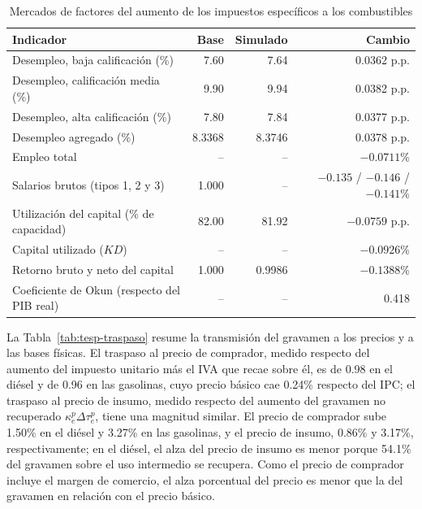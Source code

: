 \documentclass[11pt]{article}
\begin{document}
\begin{table}[H]
\centering
\caption{Mercados de factores del aumento de los impuestos específicos a los combustibles}
\small
\begin{tabular}{|l|r|r|r|}
  \hline
  Indicador & Base & Simulado & Cambio \\
  \hline
  Desempleo, baja calificación (\%) & 7.60 & 7.64 & 0.0362 p.p. \\
  \hline
  Desempleo, calificación media (\%) & 9.90 & 9.94 & 0.0382 p.p. \\
  \hline
  Desempleo, alta calificación (\%) & 7.80 & 7.84 & 0.0377 p.p. \\
  \hline
  Desempleo agregado (\%) & 8.3368 & 8.3746 & 0.0378 p.p. \\
  \hline
  Empleo total & -- & -- & $-0.0711$\% \\
  \hline
  Salarios brutos (tipos 1, 2 y 3) & 1.000 & -- & $-0.135$ / $-0.146$ / $-0.141$\% \\
  \hline
  Utilización del capital (\% de capacidad) & 82.00 & 81.92 & $-0.0759$ p.p. \\
  \hline
  Capital utilizado ($KD$) & -- & -- & $-0.0926$\% \\
  \hline
  Retorno bruto y neto del capital & 1.000 & 0.9986 & $-0.1388$\% \\
  \hline
  Coeficiente de Okun (respecto del PIB real) & -- & -- & 0.418 \\
  \hline
\end{tabular}
\end{table}

La Tabla~\ref{tab:tesp-traspaso} resume la transmisión del gravamen a los precios y a las bases físicas. El traspaso al precio de comprador, medido respecto del aumento del impuesto unitario más el IVA que recae sobre él, es de 0.98 en el diésel y de 0.96 en las gasolinas, cuyo precio básico cae 0.24\% respecto del IPC; el traspaso al precio de insumo, medido respecto del aumento del gravamen no recuperado $\kappa_{e}^{p}\Delta\tau_{e}^{p}$, tiene una magnitud similar. El precio de comprador sube 1.50\% en el diésel y 3.27\% en las gasolinas, y el precio de insumo, 0.86\% y 3.17\%, respectivamente; en el diésel, el alza del precio de insumo es menor porque 54.1\% del gravamen sobre el uso intermedio se recupera. Como el precio de comprador incluye el margen de comercio, el alza porcentual del precio es menor que la del gravamen en relación con el precio básico.
\end{document}
